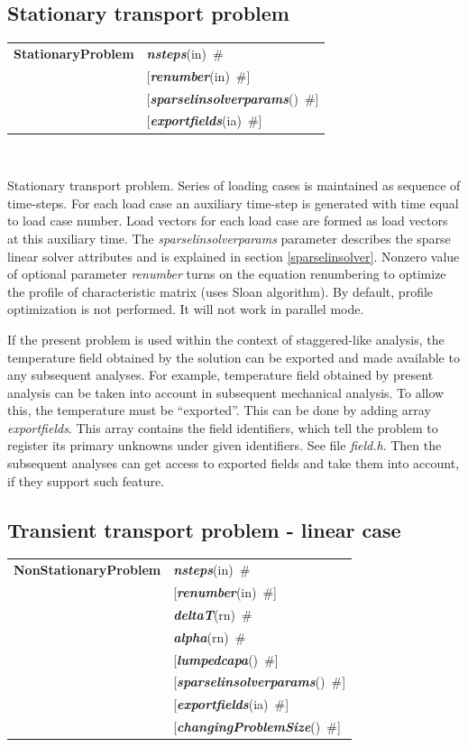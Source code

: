 \documentclass[a4paper]{article}
\makeatletter
\newcommand{\param}[1]{{\em #1}}
\newcommand{\keywordnotype}[1]{\mbox{{\it{\bf{#1}}}}}
\newcommand{\keyword}[2]{\mbox{{\keywordnotype{#1}\tiny (#2)}}}
\newcommand{\entKeywordInst}[1]{\mbox{{\bf{{#1}}}}}
\newcommand{\field}[2]{\mbox{\keyword{#1}{#2}~\#}}
\newcommand{\optField}[2]{\mbox{[\field{#1}{#2}]}}
\newenvironment{record}[1][]{\begin{tabular}{|ll}}{\end{tabular}\\}
\newcommand{\recentry}[2]{{#1}&{#2}\\}
\newcounter{rcc}
\newenvironment{record}[1][\textwidth]{\setcounter{rcc}{0}\begin{tabular*}{#1}{|ll@{\extracolsep{\fill}}r}}{\end{tabular*}\\}
\newcommand{\recentry}[2]{\ifthenelse{\value{rcc}>0}{&$\backslash$ \\}{\setcounter{rcc}{1}}{#1}&{#2}}
\makeatother
\begin{document}
\subsection{Stationary transport problem}
\label{StationaryTransport}

\begin{record}
\recentry{\entKeywordInst{StationaryProblem}}{\field{nsteps}{in}}
\recentry{}{\optField{renumber}{in}} \recentry{}{\optField{sparselinsolverparams}{}}
\recentry{}{\optField{exportfields}{ia}}
\end{record}

Stationary transport problem.
Series of loading cases is maintained as sequence of time-steps.
For each load case an auxiliary time-step is generated with time
equal to load case number.
Load vectors for each load case are formed as load vectors at
this auxiliary time.
The  \param{sparselinsolverparams} parameter describes the sparse
linear solver attributes and is explained in section \ref{sparselinsolver}.
Nonzero value of optional parameter \param{renumber} turns on the
equation renumbering to optimize the profile of characteristic matrix
(uses Sloan algorithm). By default, profile optimization is not
performed. It will not work in parallel mode.

If the present problem is used within the context
of staggered-like analysis, the temperature field obtained by the
solution can be exported and made available to any subsequent
analyses. For example, temperature field obtained by present analysis
can be taken into account in subsequent mechanical analysis.
To allow this, the temperature must be ``exported''. This can be done
by adding array \param{exportfields}. This array contains the field
identifiers, which tell the problem to register its primary unknowns
under given identifiers. See file {\it field.h}.
Then the subsequent analyses can get access to exported fields 
and take them into account, if they support such feature.

\subsection{Transient transport problem - linear case}
\label{LinearTransientTransport}

\begin{record}
\recentry{\entKeywordInst{NonStationaryProblem}}{\field{nsteps}{in}}
\recentry{}{\optField{renumber}{in}} \recentry{}{\field{deltaT}{rn}} \recentry{}{\field{alpha}{rn}}
\recentry{}{\optField{lumpedcapa}{}} \recentry{}{\optField{sparselinsolverparams}{}}
\recentry{}{\optField{exportfields}{ia}} 
\recentry{}{\optField{changingProblemSize}{}}
\end{record}
\end{document}
